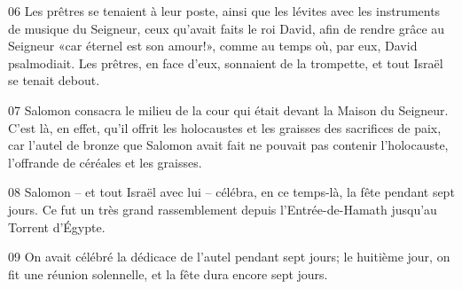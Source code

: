 
06 Les prêtres se tenaient à leur poste, ainsi que les lévites avec les instruments de musique du Seigneur, ceux qu’avait faits le roi David, afin de rendre grâce au Seigneur «car éternel est son amour!», comme au temps où, par eux, David psalmodiait. Les prêtres, en face d’eux, sonnaient de la trompette, et tout Israël se tenait debout.

07 Salomon consacra le milieu de la cour qui était devant la Maison du Seigneur. C’est là, en effet, qu’il offrit les holocaustes et les graisses des sacrifices de paix, car l’autel de bronze que Salomon avait fait ne pouvait pas contenir l’holocauste, l’offrande de céréales et les graisses.

08 Salomon – et tout Israël avec lui – célébra, en ce temps-là, la fête pendant sept jours. Ce fut un très grand rassemblement depuis l’Entrée-de-Hamath jusqu’au Torrent d’Égypte.

09 On avait célébré la dédicace de l’autel pendant sept jours; le huitième jour, on fit une réunion solennelle, et la fête dura encore sept jours.
